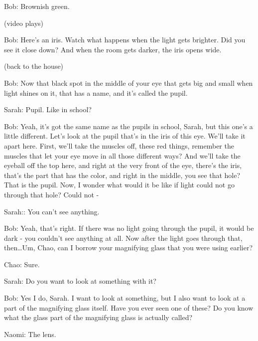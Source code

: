 Bob: Brownish green.

(video plays)

Bob: Here's an iris. Watch what happens when the light gets brighter. Did you see it close down? And when the room gets darker, the iris opens wide.

(back to the house)

Bob: Now that black spot in the middle of your eye that gets big and small when light shines on it, that has a name, and it's called the pupil.

Sarah: Pupil. Like in school?

Bob: Yeah, it's got the same name as the pupils in school, Sarah, but this one's a little different. Let's look at the pupil that's in the iris of this eye. We'll take it apart here. First, we'll take the muscles off, these red things, remember the muscles that let your eye move in all those different ways? And we'll take the eyeball off the top here, and right at the very front of the eye, there's the iris, that's the part that has the color, and right in the middle, you see that hole? That is the pupil. Now, I wonder what would it be like if light could not go through that hole? Could not -

Sarah:: You can't see anything.

Bob: Yeah, that's right. If there was no light going through the pupil, it would be dark - you couldn't see anything at all. Now after the light goes through that, then\dots Um, Chao, can I borrow your magnifying glass that you were using earlier?

Chao: Sure.

Sarah: Do you want to look at something with it?

Bob: Yes I do, Sarah. I want to look at something, but I also want to look at a part of the magnifying glass itself. Have you ever seen one of these? Do you know what the glass part of the magnifying glass is actually called?

Naomi: The lens.

